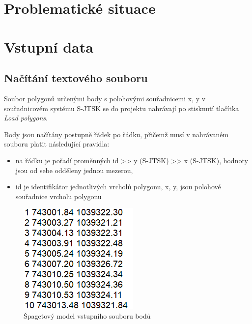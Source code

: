 \documentclass[11pt]{article}
\begin{document}
\section{Problematické situace}
	




\section{Vstupní data}
\subsection{Načítání textového souboru}

Soubor polygonů určenými body s polohovými souřadnicemi x, y v souřadnicovém systému S-JTSK se do projektu nahrávají po stisknutí  tlačítka \textit{Load polygons}.

Body jsou načítány postupně řádek po řádku, přičemž musí v nahrávaném souboru platit následující pravidla:    

\begin{itemize}
\item na řádku je pořadí proměnných id >> y (S-JTSK) >> x (S-JTSK),  hodnoty jsou od sebe odděleny jednou mezerou,
\item id je identifikátor jednotlivých vrcholů polygonu, x, y, jsou polohové souřadnice vrcholu polygonu

\end{itemize}

\begin{figure}[htbh]
	\centering	
	\includegraphics[scale=1]{images/vstup_polygon.png} 
	\caption{Špagetový model vstupního souboru bodů}
	\label{fig:vstup.}
\end{figure} 
\FloatBarrier
\end{document}
